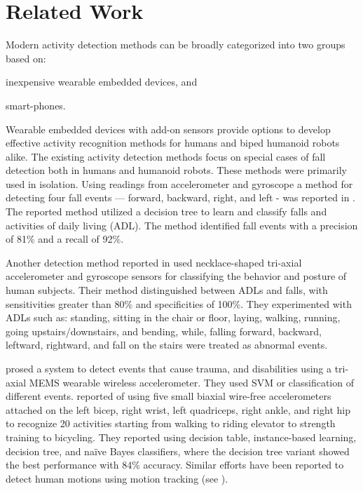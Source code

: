 \documentclass[]{IEEEtran}
\begin{document}
\section{Related Work}
\label{subSec:relatedWork}

Modern activity detection methods can be broadly categorized into two groups based on: 
\begin{inparaenum}[($i$)] \item inexpensive wearable embedded devices, and \item smart-phones. 
\end{inparaenum} Wearable embedded devices with add-on sensors provide options to develop effective 
activity recognition methods for humans and biped humanoid robots alike. The existing activity 
detection methods focus on special cases of fall detection both in humans and humanoid robots. These 
methods were primarily used in isolation.  Using readings from accelerometer and gyroscope a method for detecting four fall events --- forward, backward, right, and left - was reported in \cite{ojetolaFallDetection2011}.  The reported method utilized  a decision tree to 
learn and classify falls and activities of daily living (ADL). The method identified fall events 
with a precision of 81\%  and a recall of 92\%. 

Another detection method reported in\cite{baekFallDetection2013} used necklace-shaped tri-axial
accelerometer  and  gyroscope  sensors  for classifying  the  behavior  and  posture  of  human
 subjects. Their method distinguished between  ADLs and  falls, with  sensitivities  greater  than 
 80\%  and specificities  of  100\%. They experimented with ADLs such as: standing, sitting in the 
 chair or floor, laying, walking, running, going upstairs/downstairs, and bending, while, 
 falling forward, backward, leftward, rightward, and fall on the stairs were treated as abnormal 
 events. 
 
\cite{leoneFallDetection2013} prosed a system to detect events that cause trauma, and disabilities
using a tri-axial MEMS wearable wireless accelerometer. They used SVM or
classification of different events. \cite{BaoActivityrecognition2004} reported of using five 
small biaxial wire-free accelerometers attached  on the left bicep, right wrist, left quadriceps, 
right ankle, and right hip to recognize 20 activities starting from  walking  to  riding elevator  
to  strength  training to bicycling. They reported using decision table, instance-based learning, 
decision tree, and na\"{i}ve Bayes classifiers, where the decision tree variant showed the best performance 
with 84\% accuracy.  Similar efforts have been reported to detect human motions using motion 
tracking (see 
\cite{dumitracheFallDetection2013,kumarActivitAndFallDetection2013,krishnanActivityRecognition2014,gaoActivityRecognition2014,alvarezActivityAndFallRecognotion2015}).
 
\end{document}
